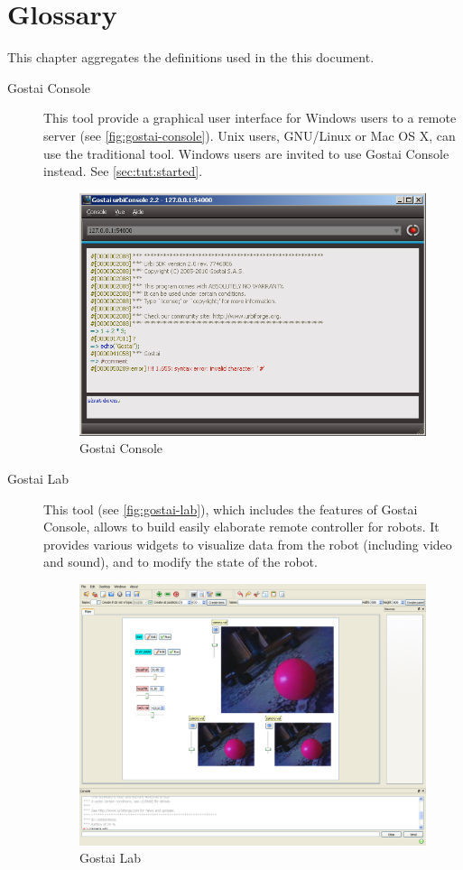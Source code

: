 \chapter{Glossary}
\label{sec:glossary}

This chapter aggregates the definitions used in the this document.

\begin{description}
\item[Gostai Console] This tool provide a graphical user interface for
  Windows users to a remote \urbi server (see
  \autoref{fig:gostai-console}).  Unix users, GNU/Linux or Mac OS X,
  can use the traditional  tool.  Windows users are
  invited to use Gostai Console instead.  See
  \autoref{sec:tut:started}.

  \begin{figure}[htp]
    \centering
    \includegraphics[width=.8\linewidth]{img/urbi-console}
    \caption{Gostai Console}
    \label{fig:gostai-console}
  \end{figure}


\item[Gostai Lab] This tool (see \autoref{fig:gostai-lab}), which
  includes the features of Gostai Console, allows to build easily
  elaborate remote controller for robots.  It provides various widgets
  to visualize data from the robot (including video and sound), and to
  modify the state of the robot.

  \begin{figure}[htp]
    \centering
    \includegraphics[width=.8\linewidth]{img/gostai-lab}
    \caption{Gostai Lab}
    \label{fig:gostai-lab}
  \end{figure}


\end{description}
